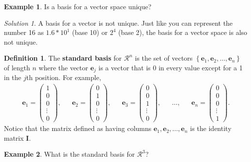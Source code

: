 \documentclass[
]{book}
\theoremstyle{definition}
\newtheorem{definition}{Definition}[chapter]
\theoremstyle{definition}
\newtheorem{example}{Example}[chapter]
\theoremstyle{definition}
\theoremstyle{definition}
\theoremstyle{remark}
\newtheorem*{solution}{Solution}
\begin{document}
\begin{example}
Is a basis for a vector space unique?
\end{example}

\begin{solution}
A basis for a vector is not unique. Just like you can represent the number 16 as \(1.6 * 10^1\) (base 10) or \(2^4\) (base 2), the basis for a vector space is also not unique.
\end{solution}

\begin{definition}
\protect\hypertarget{def:standard-basis}{}\label{def:standard-basis}The \textbf{standard basis} for \(\mathcal{R}^n\) is the set of vectors \(\left\{ \mathbf{e}_1, \mathbf{e}_2, \ldots, \mathbf{e}_n \right\}\) of length \(n\) where the vector \(\mathbf{e}_j\) is a vector that is 0 in every value except for a 1 in the \(j\)th position. For example,
\[
\begin{aligned}
\mathbf{e}_1 = \begin{pmatrix} 1 \\ 0 \\ 0 \\ \vdots \\ 0 \end{pmatrix}, && \mathbf{e}_2 = \begin{pmatrix} 0 \\ 1 \\ 0 \\ \vdots \\ 0 \end{pmatrix}, && \mathbf{e}_3 = \begin{pmatrix} 0 \\ 0 \\ 1 \\ \vdots \\ 0\end{pmatrix}, && \ldots, && \mathbf{e}_n = \begin{pmatrix} 0 \\ 0 \\ 0 \\ \vdots \\ 1 \end{pmatrix}.
\end{aligned}
\]
Notice that the matrix defined as having columns \(\mathbf{e}_1, \mathbf{e}_2, \ldots, \mathbf{e}_n\) is the identity matrix \(\mathbf{I}\).
\end{definition}

\begin{example}
What is the standard basis for \(\mathcal{R}^3\)?
\end{example}
\end{document}
